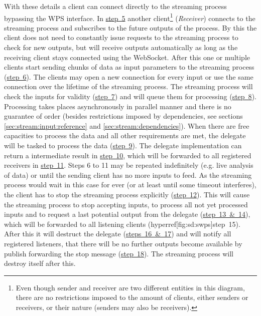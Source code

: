	With these details a client can connect directly to the streaming process bypassing the \ac{WPS} interface. In \hyperref[fig:sd:swps]{step~5} another client\footnote{Even though sender and receiver are two different entities in this diagram, there are no restrictions imposed to the amount of clients, either senders or receivers, or their nature (senders may also be receivers).} (\emph{Receiver}) connects to the streaming process and subscribes to the future outputs of the process. By this the client does not need to constantly issue requests to the streaming process to check for new outputs, but will receive outputs automatically as long as the receiving client stays connected using the WebSocket.
	After this one or multiple clients start sending chunks of data as input parameters to the streaming process (\hyperref[fig:sd:swps]{step~6}). The clients may open a new connection for every input or use the same connection over the lifetime of the streaming process. The streaming process will check the inputs for validity (\hyperref[fig:sd:swps]{step~7}) and will queue them for processing (\hyperref[fig:sd:swps]{step~8}).
	Processing takes places asynchronously in parallel manner and there is no guarantee of order (besides restrictions imposed by dependencies, see sections \ref{sec:stream:input:reference} and \ref{sec:stream:dependencies}). When there are free capacities to process the data and all other requirements are met, the delegate will be tasked to process the data (\hyperref[fig:sd:swps]{step~9}). The delegate implementation can return a intermediate result in \hyperref[fig:sd:swps]{step~10}, which will be forwarded to all registered receivers in \hyperref[fig:sd:swps]{step~11}.
	Steps 6 to 11 may be repeated indefinitely (e.g. live analysis of data) or until the sending client has no more inputs to feed. As the streaming process would wait in this case for ever (or at least until some timeout interferes), the client has to stop the streaming process explicitly (\hyperref[fig:sd:swps]{step~12}).
	This will cause the streaming process to stop accepting inputs, to process all not yet processed inputs and to request a last potential output from the delegate (\hyperref[fig:sd:swps]{step~13~\&~14}), which will be forwarded to all listening clients (hyperref[fig:sd:swps]{step~15}). After this it will destruct the delegate (\hyperref[fig:sd:swps]{steps~16~\&~17}) and will notify all registered listeners, that there will be no further outputs become available by publish forwarding the stop message (\hyperref[fig:sd:swps]{step~18}). The streaming process will destroy itself after this.

